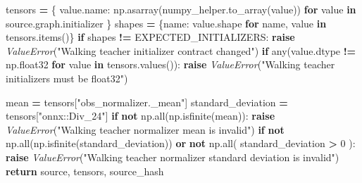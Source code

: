 \documentclass[
  chinese,
  11pt,
  letterpaper,
]{article}
\newenvironment{Shaded}{\begin{snugshade}}{\end{snugshade}}
\newcommand{\BuiltInTok}[1]{#1}
\newcommand{\ControlFlowTok}[1]{\textcolor[rgb]{0.13,0.29,0.53}{\textbf{#1}}}
\newcommand{\DecValTok}[1]{\textcolor[rgb]{0.00,0.00,0.81}{#1}}
\newcommand{\KeywordTok}[1]{\textcolor[rgb]{0.13,0.29,0.53}{\textbf{#1}}}
\newcommand{\NormalTok}[1]{#1}
\newcommand{\OperatorTok}[1]{\textcolor[rgb]{0.81,0.36,0.00}{\textbf{#1}}}
\newcommand{\PreprocessorTok}[1]{\textcolor[rgb]{0.56,0.35,0.01}{\textit{#1}}}
\newcommand{\StringTok}[1]{\textcolor[rgb]{0.31,0.60,0.02}{#1}}
\renewenvironment{Shaded}{\par\smallskip}{\par\smallskip}
\begin{document}
\begin{Shaded}
\begin{Highlighting}[]
\NormalTok{    tensors }\OperatorTok{=}\NormalTok{ \{}
\NormalTok{        value.name: np.asarray(numpy\_helper.to\_array(value))}
        \ControlFlowTok{for}\NormalTok{ value }\KeywordTok{in}\NormalTok{ source.graph.initializer}
\NormalTok{    \}}
\NormalTok{    shapes }\OperatorTok{=}\NormalTok{ \{name: value.shape }\ControlFlowTok{for}\NormalTok{ name, value }\KeywordTok{in}\NormalTok{ tensors.items()\}}
    \ControlFlowTok{if}\NormalTok{ shapes }\OperatorTok{!=}\NormalTok{ EXPECTED\_INITIALIZERS:}
        \ControlFlowTok{raise} \PreprocessorTok{ValueError}\NormalTok{(}\StringTok{"Walking teacher initializer contract changed"}\NormalTok{)}
    \ControlFlowTok{if} \BuiltInTok{any}\NormalTok{(value.dtype }\OperatorTok{!=}\NormalTok{ np.float32 }\ControlFlowTok{for}\NormalTok{ value }\KeywordTok{in}\NormalTok{ tensors.values()):}
        \ControlFlowTok{raise} \PreprocessorTok{ValueError}\NormalTok{(}\StringTok{"Walking teacher initializers must be float32"}\NormalTok{)}

\NormalTok{    mean }\OperatorTok{=}\NormalTok{ tensors[}\StringTok{"obs\_normalizer.\_mean"}\NormalTok{]}
\NormalTok{    standard\_deviation }\OperatorTok{=}\NormalTok{ tensors[}\StringTok{"onnx::Div\_24"}\NormalTok{]}
    \ControlFlowTok{if} \KeywordTok{not}\NormalTok{ np.}\BuiltInTok{all}\NormalTok{(np.isfinite(mean)):}
        \ControlFlowTok{raise} \PreprocessorTok{ValueError}\NormalTok{(}\StringTok{"Walking teacher normalizer mean is invalid"}\NormalTok{)}
    \ControlFlowTok{if} \KeywordTok{not}\NormalTok{ np.}\BuiltInTok{all}\NormalTok{(np.isfinite(standard\_deviation)) }\KeywordTok{or} \KeywordTok{not}\NormalTok{ np.}\BuiltInTok{all}\NormalTok{(}
\NormalTok{        standard\_deviation }\OperatorTok{\textgreater{}} \DecValTok{0}
\NormalTok{    ):}
        \ControlFlowTok{raise} \PreprocessorTok{ValueError}\NormalTok{(}\StringTok{"Walking teacher normalizer standard deviation is invalid"}\NormalTok{)}
    \ControlFlowTok{return}\NormalTok{ source, tensors, source\_hash}



\end{Highlighting}
\end{Shaded}
\end{document}

